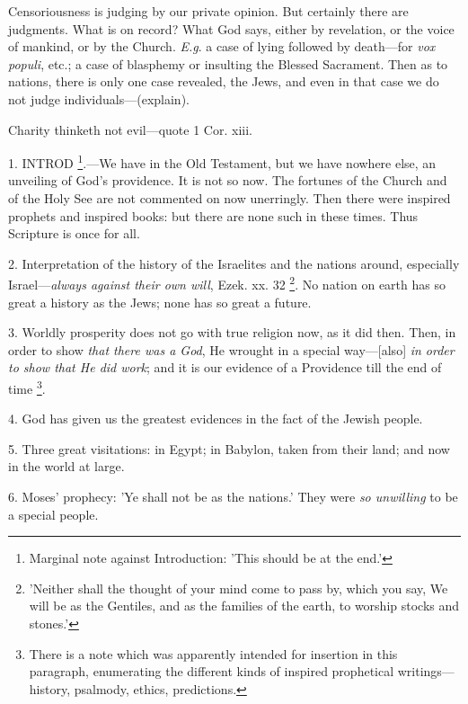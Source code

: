 Censoriousness is judging by our private opinion.
But certainly there are judgments. What is on record? What God says,
either by revelation, or the voice of mankind, or by the Church. \emph{E.g}.
a case of lying followed by death—for \emph{vox populi}, etc.; a
case of blasphemy or insulting the Blessed Sacrament. Then as to
nations, there is only one case revealed, the Jews, and even in that
case we do not judge individuals—(explain).

Charity thinketh not evil—quote 1 Cor. xiii.


1. INTROD \footnote{Marginal note against
Introduction: 'This should be at the end.'}.—We have in the Old Testament, but we have nowhere else, an
unveiling of God's providence. It is not so now. The fortunes of the
Church and of the Holy See are not commented on now unerringly. Then
there were inspired prophets and inspired books: but there are none
such in these times. Thus Scripture is once for all.

2. Interpretation of the history of the
Israelites and the nations around, especially Israel—\emph{always
against their own will}, Ezek. xx. 32 \footnote{'Neither shall the
thought of your mind come to pass by, which you say, We will be as the
Gentiles, and as the families of the earth, to worship stocks and
stones.'}. No nation on earth has so great a history as the Jews; none
has so great a future.

3. Worldly prosperity does not go with true
religion now, as it did then. Then, in order to show \emph{that there was
a God}, He wrought in a special way—[also] \emph{in order to show
that He did work}; and it is our evidence of a Providence till the
end of time \footnote{There is a note which
was apparently intended for insertion in this paragraph, enumerating
the different kinds of inspired prophetical writings—history,
psalmody, ethics, predictions.}.

4. God has given us the greatest evidences in the
fact of the Jewish people.

5. Three great visitations: in Egypt; in Babylon,
taken from their land; and now in the world at large.

6. Moses' prophecy: 'Ye shall not be as the
nations.' They were \emph{so unwilling} to be a special people.


